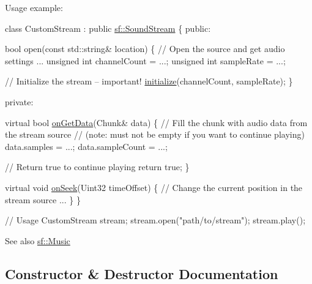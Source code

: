 Usage example\+: 
\begin{DoxyCode}
\textcolor{keyword}{class }CustomStream : \textcolor{keyword}{public} \hyperlink{classsf_1_1_sound_stream}{sf::SoundStream}
\{
\textcolor{keyword}{public}:

    \textcolor{keywordtype}{bool} open(\textcolor{keyword}{const} std::string& location)
    \{
        \textcolor{comment}{// Open the source and get audio settings}
        ...
        \textcolor{keywordtype}{unsigned} \textcolor{keywordtype}{int} channelCount = ...;
        \textcolor{keywordtype}{unsigned} \textcolor{keywordtype}{int} sampleRate = ...;

        \textcolor{comment}{// Initialize the stream -- important!}
        \hyperlink{classsf_1_1_sound_stream_a9c351711198ee1aa77c2fefd3ced4d2c}{initialize}(channelCount, sampleRate);
    \}

\textcolor{keyword}{private}:

    \textcolor{keyword}{virtual} \textcolor{keywordtype}{bool} \hyperlink{classsf_1_1_sound_stream_a968ec024a6e45490962c8a1121cb7c5f}{onGetData}(Chunk& data)
    \{
        \textcolor{comment}{// Fill the chunk with audio data from the stream source}
        \textcolor{comment}{// (note: must not be empty if you want to continue playing)}
        data.samples = ...;
        data.sampleCount = ...;

        \textcolor{comment}{// Return true to continue playing}
        \textcolor{keywordflow}{return} \textcolor{keyword}{true};
    \}

    \textcolor{keyword}{virtual} \textcolor{keywordtype}{void} \hyperlink{classsf_1_1_sound_stream_a907036dd2ca7d3af5ead316e54b75997}{onSeek}(Uint32 timeOffset)
    \{
        \textcolor{comment}{// Change the current position in the stream source}
        ...
    \}
\}

\textcolor{comment}{// Usage}
CustomStream stream;
stream.open(\textcolor{stringliteral}{"path/to/stream"});
stream.play();
\end{DoxyCode}


\begin{DoxySeeAlso}{See also}
\hyperlink{classsf_1_1_music}{sf\+::\+Music} 
\end{DoxySeeAlso}


\subsection{Constructor \& Destructor Documentation}
\mbox{\label{classsf_1_1_sound_stream_a769d08f4c3c6b4340ef3a838329d2e5c}} 
